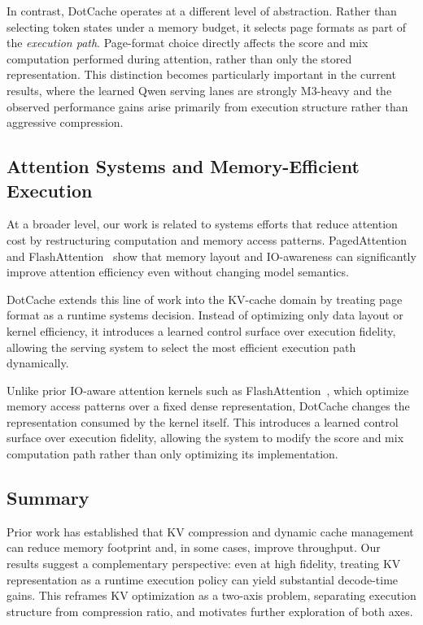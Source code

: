 \documentclass[11pt]{article}
\begin{document}
In contrast, DotCache operates at a different level of abstraction. Rather than selecting token states under a memory budget, it selects page formats as part of the \emph{execution path}. Page-format choice directly affects the score and mix computation performed during attention, rather than only the stored representation. This distinction becomes particularly important in the current results, where the learned Qwen serving lanes are strongly M3-heavy and the observed performance gains arise primarily from execution structure rather than aggressive compression.

\subsection{Attention Systems and Memory-Efficient Execution}

At a broader level, our work is related to systems efforts that reduce attention cost by restructuring computation and memory access patterns. PagedAttention~\cite{pagedattention} and FlashAttention~\cite{flashattention,flashattention2} show that memory layout and IO-awareness can significantly improve attention efficiency even without changing model semantics.

DotCache extends this line of work into the KV-cache domain by treating page format as a runtime systems decision. Instead of optimizing only data layout or kernel efficiency, it introduces a learned control surface over execution fidelity, allowing the serving system to select the most efficient execution path dynamically.

Unlike prior IO-aware attention kernels such as FlashAttention~\cite{flashattention,flashattention2}, which optimize memory access patterns over a fixed dense representation, DotCache changes the representation consumed by the kernel itself. This introduces a learned control surface over execution fidelity, allowing the system to modify the score and mix computation path rather than only optimizing its implementation.

\subsection{Summary}

Prior work has established that KV compression and dynamic cache management can reduce memory footprint and, in some cases, improve throughput. Our results suggest a complementary perspective: even at high fidelity, treating KV representation as a runtime execution policy can yield substantial decode-time gains. This reframes KV optimization as a two-axis problem, separating execution structure from compression ratio, and motivates further exploration of both axes.
\end{document}
